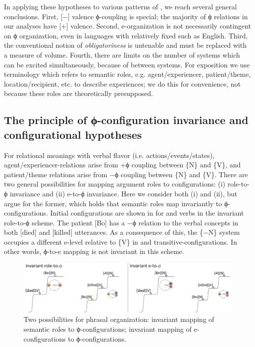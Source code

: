   In applying these hypotheses to various patterns of , we reach several general conclusions. First, [−] valence ϕ-coupling is special; the majority of ϕ relations in our analyses have [+] valence. Second, e-organization is not necessarily contingent on ϕ organization, even in languages with relatively fixed  such as English. Third, the conventional notion of \textit{obligatoriness} is untenable and must be replaced with a measure of  volume. Fourth, there are limits on the number of systems which can be excited simultaneously, because of  between systems. For exposition we use terminology which refers to semantic roles, e.g. agent/experiencer, patient/theme, location/recipient, etc. to describe  experiences; we do this for convenience, not because these roles are theoretically presupposed.

\subsection{The principle of \textup{ϕ-configuration} invariance and configurational hypotheses}

For relational meanings with verbal flavor (i.e. actions/events/states), agent/ex\-pe\-ri\-en\-cer-relations arise from +ϕ coupling between \{N\} and \{V\}, and patient/theme relations arise from −ϕ coupling between \{N\} and \{V\}. There are two general possibilities for mapping argument roles to configurations: (i) role-to-ϕ invariance and (ii) e-to-ϕ invariance. Here we consider both (i) and (ii), but argue for the former, which holds that semantic roles map invariantly to ϕ-configurations. Initial configurations are shown in {} for  and  verbs in the invariant role-to-ϕ scheme. The patient [Bo] has a −ϕ relation to the verbal concepts in both  [died] and  [killed] utterances. As a consequence of this, the \{−N\} system occupies a different e-level relative to \{V\} in  and transitive-configurations. In other words, ϕ-to-e mapping is not invariant in this scheme.

  
\begin{figure}
\includegraphics[width=\textwidth]{figures/Tilsen-img71.png}
\caption{Two possibilities for phrasal organization: invariant mapping of semantic roles to ϕ-configurations; invariant mapping of e-configurations to ϕ-configurations.}
\label{fig:4:21}
\end{figure}
 

